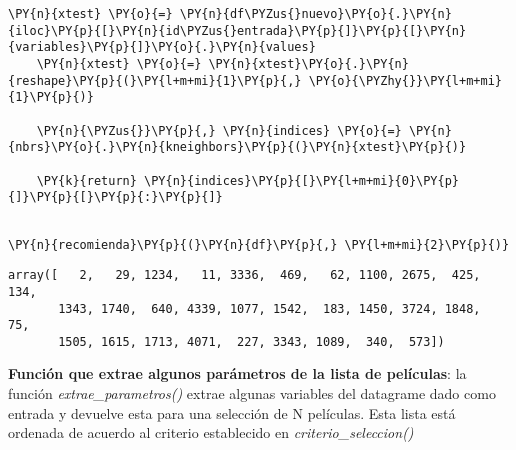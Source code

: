 \begin{tcolorbox}[breakable, size=fbox, boxrule=1pt, pad at break*=1mm,colback=cellbackground, colframe=cellborder]
\begin{Verbatim}[commandchars=\\\{\}]
    \PY{n}{xtest} \PY{o}{=} \PY{n}{df\PYZus{}nuevo}\PY{o}{.}\PY{n}{iloc}\PY{p}{[}\PY{n}{id\PYZus{}entrada}\PY{p}{]}\PY{p}{[}\PY{n}{variables}\PY{p}{]}\PY{o}{.}\PY{n}{values}
    \PY{n}{xtest} \PY{o}{=} \PY{n}{xtest}\PY{o}{.}\PY{n}{reshape}\PY{p}{(}\PY{l+m+mi}{1}\PY{p}{,} \PY{o}{\PYZhy{}}\PY{l+m+mi}{1}\PY{p}{)}

    \PY{n}{\PYZus{}}\PY{p}{,} \PY{n}{indices} \PY{o}{=} \PY{n}{nbrs}\PY{o}{.}\PY{n}{kneighbors}\PY{p}{(}\PY{n}{xtest}\PY{p}{)}

    \PY{k}{return} \PY{n}{indices}\PY{p}{[}\PY{l+m+mi}{0}\PY{p}{]}\PY{p}{[}\PY{p}{:}\PY{p}{]}
    
\end{Verbatim}
\end{tcolorbox}

    \begin{tcolorbox}[breakable, size=fbox, boxrule=1pt, pad at break*=1mm,colback=cellbackground, colframe=cellborder]
\begin{Verbatim}[commandchars=\\\{\}]
\PY{n}{recomienda}\PY{p}{(}\PY{n}{df}\PY{p}{,} \PY{l+m+mi}{2}\PY{p}{)}
\end{Verbatim}
\end{tcolorbox}

            \begin{tcolorbox}[breakable, size=fbox, boxrule=.5pt, pad at break*=1mm, opacityfill=0]
\begin{Verbatim}[commandchars=\\\{\}]
array([   2,   29, 1234,   11, 3336,  469,   62, 1100, 2675,  425,  134,
       1343, 1740,  640, 4339, 1077, 1542,  183, 1450, 3724, 1848,   75,
       1505, 1615, 1713, 4071,  227, 3343, 1089,  340,  573])
\end{Verbatim}
\end{tcolorbox}
        
    \textbf{Función que extrae algunos parámetros de la lista de películas}:
la función \emph{extrae\_parametros()} extrae algunas variables del
datagrame dado como entrada y devuelve esta para una selección de N
películas. Esta lista está ordenada de acuerdo al criterio establecido
en \emph{criterio\_seleccion()}

